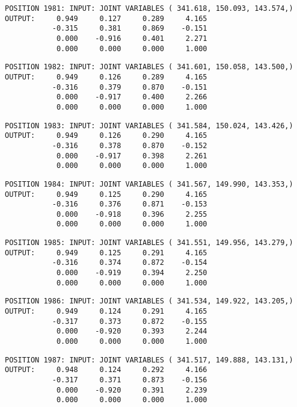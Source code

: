 \begin{verbatim}
POSITION 1981: INPUT: JOINT VARIABLES ( 341.618, 150.093, 143.574,)
OUTPUT:     0.949     0.127     0.289     4.165
           -0.315     0.381     0.869    -0.151
            0.000    -0.916     0.401     2.271
            0.000     0.000     0.000     1.000
\end{verbatim} \pagebreak[1]\begin{verbatim}
POSITION 1982: INPUT: JOINT VARIABLES ( 341.601, 150.058, 143.500,)
OUTPUT:     0.949     0.126     0.289     4.165
           -0.316     0.379     0.870    -0.151
            0.000    -0.917     0.400     2.266
            0.000     0.000     0.000     1.000
\end{verbatim} \pagebreak[1]\begin{verbatim}
POSITION 1983: INPUT: JOINT VARIABLES ( 341.584, 150.024, 143.426,)
OUTPUT:     0.949     0.126     0.290     4.165
           -0.316     0.378     0.870    -0.152
            0.000    -0.917     0.398     2.261
            0.000     0.000     0.000     1.000
\end{verbatim} \pagebreak[1]\begin{verbatim}
POSITION 1984: INPUT: JOINT VARIABLES ( 341.567, 149.990, 143.353,)
OUTPUT:     0.949     0.125     0.290     4.165
           -0.316     0.376     0.871    -0.153
            0.000    -0.918     0.396     2.255
            0.000     0.000     0.000     1.000
\end{verbatim} \pagebreak[1]\begin{verbatim}
POSITION 1985: INPUT: JOINT VARIABLES ( 341.551, 149.956, 143.279,)
OUTPUT:     0.949     0.125     0.291     4.165
           -0.316     0.374     0.872    -0.154
            0.000    -0.919     0.394     2.250
            0.000     0.000     0.000     1.000
\end{verbatim} \pagebreak[1]\begin{verbatim}
POSITION 1986: INPUT: JOINT VARIABLES ( 341.534, 149.922, 143.205,)
OUTPUT:     0.949     0.124     0.291     4.165
           -0.317     0.373     0.872    -0.155
            0.000    -0.920     0.393     2.244
            0.000     0.000     0.000     1.000
\end{verbatim} \pagebreak[1]\begin{verbatim}
POSITION 1987: INPUT: JOINT VARIABLES ( 341.517, 149.888, 143.131,)
OUTPUT:     0.948     0.124     0.292     4.166
           -0.317     0.371     0.873    -0.156
            0.000    -0.920     0.391     2.239
            0.000     0.000     0.000     1.000
\end{verbatim} \pagebreak[1]\begin{verbatim}

\end{verbatim}

